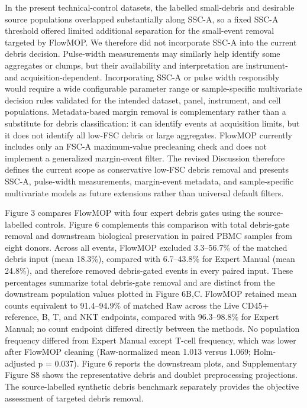 \documentclass[
  11pt,
  a4paper,
]{article}
\begin{document}
In the present technical-control datasets, the labelled small-debris and
desirable source populations overlapped substantially along SSC-A, so a
fixed SSC-A threshold offered limited additional separation for the
small-event removal targeted by FlowMOP. We therefore did not
incorporate SSC-A into the current debris decision. Pulse-width
measurements may similarly help identify some aggregates or clumps, but
their availability and interpretation are instrument- and
acquisition-dependent. Incorporating SSC-A or pulse width responsibly
would require a wide configurable parameter range or sample-specific
multivariate decision rules validated for the intended dataset, panel,
instrument, and cell populations. Metadata-based margin removal is
complementary rather than a substitute for debris classification: it can
identify events at acquisition limits, but it does not identify all
low-FSC debris or large aggregates. FlowMOP currently includes only an
FSC-A maximum-value precleaning check and does not implement a
generalized margin-event filter. The revised Discussion therefore
defines the current scope as conservative low-FSC debris removal and
presents SSC-A, pulse-width measurements, margin-event metadata, and
sample-specific multivariate models as future extensions rather than
universal default filters.

Figure 3 compares FlowMOP with four expert debris gates using the
source-labelled controls. Figure 6 complements this comparison with
total debris-gate removal and downstream biological preservation in
paired PBMC samples from eight donors. Across all events, FlowMOP
excluded 3.3--56.7\% of the matched debris input (mean 18.3\%), compared
with 6.7--43.8\% for Expert Manual (mean 24.8\%), and therefore removed
debris-gated events in every paired input. These percentages summarize
total debris-gate removal and are distinct from the downstream
population values plotted in Figure 6B,C. FlowMOP retained mean counts
equivalent to 91.4--94.9\% of matched Raw across the Live CD45+
reference, B, T, and NKT endpoints, compared with 96.3--98.8\% for
Expert Manual; no count endpoint differed directly between the methods.
No population frequency differed from Expert Manual except T-cell
frequency, which was lower after FlowMOP cleaning (Raw-normalized mean
1.013 versus 1.069; Holm-adjusted p = 0.037). Figure 6 reports the
downstream plots, and Supplementary Figure S8 shows the representative
debris and doublet preprocessing projections. The source-labelled
synthetic debris benchmark separately provides the objective assessment
of targeted debris removal.
\end{document}
